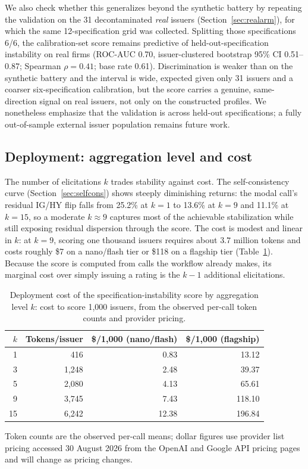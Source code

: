 \documentclass[a4paper,fleqn]{cas-sc}
\begin{document}
We also check whether this generalizes beyond the synthetic battery by repeating the validation on the
31 decontaminated \emph{real} issuers (Section~\ref{sec:realarm}), for which the same 12-specification
grid was collected. Splitting those specifications 6/6, the calibration-set score remains predictive of
held-out-specification instability on real firms (ROC-AUC 0.70, issuer-clustered bootstrap 95\% CI
0.51--0.87; Spearman $\rho=0.41$; base rate 0.61). Discrimination is weaker than on the synthetic battery
and the interval is wide, expected given only 31 issuers and a coarser six-specification calibration, but
the score carries a genuine, same-direction signal on real issuers, not only on the constructed profiles.
We nonetheless emphasize that the validation is across held-out specifications; a fully out-of-sample
external issuer population remains future work.

\subsection{Deployment: aggregation level and cost}\label{sec:sis-cost}
The number of elicitations $k$ trades stability against cost. The self-consistency curve
(Section~\ref{sec:selfcons}) shows steeply diminishing returns: the modal call's residual IG/HY flip
falls from 25.2\% at $k=1$ to 13.6\% at $k=9$ and 11.1\% at $k=15$, so a moderate $k\!\approx\!9$ captures
most of the achievable stabilization while still exposing residual dispersion through the score. The cost
is modest and linear in $k$: at $k=9$, scoring one thousand issuers requires about $3.7$ million tokens
and costs roughly \$7 on a nano/flash tier or \$118 on a flagship tier (Table~\ref{tab:cost}). Because the
score is computed from calls the workflow already makes, its marginal cost over simply issuing a rating is
the $k-1$ additional elicitations.

\begin{table}[t]\centering
\caption{Deployment cost of the specification-instability score by aggregation level $k$: cost to score
1{,}000 issuers, from the observed per-call token counts and provider pricing.}\label{tab:cost}
\begin{tabular}{rrrr}\toprule
$k$ & Tokens/issuer & \$/1{,}000 (nano/flash) & \$/1{,}000 (flagship) \\\midrule
1 & 416 & 0.83 & 13.12 \\
3 & 1{,}248 & 2.48 & 39.37 \\
5 & 2{,}080 & 4.13 & 65.61 \\
9 & 3{,}745 & 7.43 & 118.10 \\
15 & 6{,}242 & 12.38 & 196.84 \\\bottomrule
\end{tabular}

\vspace{3pt}
{\footnotesize\raggedright Token counts are the observed per-call means; dollar figures use provider list
pricing accessed 30 August 2026 from the OpenAI and Google API pricing pages and will change as pricing
changes.\par}
\end{table}
\end{document}
